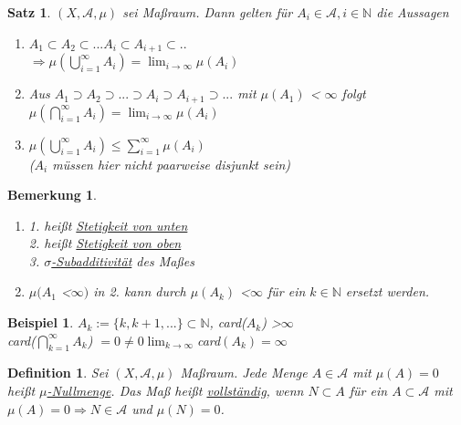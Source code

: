 \documentclass[11pt]{memoir}
\theoremstyle{changebreak}
\newtheorem{Definition}{Definition}[chapter]
\newtheorem{Bemerkung}{Bemerkung}[chapter]
\newtheorem{Beispiel}{Beispiel}[chapter]
\newtheorem{Satz}{Satz}[chapter]
\begin{document}
\begin{Satz}
$(X, \mathscr{A}, \mu)$ sei Maßraum. Dann gelten für $A_i \in \mathscr{A}, i \in \mathbb{N}$ die Aussagen
\begin{enumerate}
	\item $A_1 \subset A_2 \subset ...  A_i \subset A_{i+1} \subset .. $\\
	$\Rightarrow \mu(\bigcup\limits_{i=1}^{\infty} A_i) = \lim_{i \rightarrow \infty} \mu(A_i)$
	\item Aus $A_1 \supset A_2 \supset ... \supset A_i \supset A_{i+1} \supset ...$ mit $\mu(A_1)$ \textless  {} $ \infty$ folgt\\
	$\mu(\bigcap\limits_{i=1}^{\infty} A_i) = \lim_{i \rightarrow \infty} \mu(A_i)$
	\item $\mu(\bigcup\limits_{i=1}^{\infty} A_i) \leq \sum\limits_{i=1}^{\infty} \mu(A_i)$ \\
	($A_i$ müssen hier nicht paarweise disjunkt sein)
\end{enumerate}
\end{Satz}

\begin{Bemerkung}
\begin{enumerate}
	\item \emph{1.} heißt \underline{Stetigkeit von unten} \\
	\emph{2.} heißt \underline{Stetigkeit von oben} \\
	\emph{3.} \underline{$\sigma$-Subadditivität} des Maßes
	\item  $\mu(A_1$ \textless $\infty)$ in \emph{2.} kann durch $\mu(A_k) $ \textless  $\infty$ für ein $k \in \mathbb{N}$ ersetzt werden.
\end{enumerate}
\end{Bemerkung}

\begin{Beispiel}
$A_k := \{k, k+1, ... \} \subset \mathbb{N}$, card($A_k$) \textgreater $ \infty$ \\
card($\bigcap\limits_{k=1}^{\infty} A_k$) $= 0 \ne 0 \lim_{k \rightarrow \infty} $card$ (A_k) = \infty$
\end{Beispiel}

\begin{Definition}
Sei $(X, \mathscr{A}, \mu)$ Maßraum. Jede Menge $A \in \mathscr{A}$ mit $\mu(A) = 0$ heißt \underline{$\mu$-Nullmenge}. Das Maß heißt \underline{vollständig}, wenn $N \subset A $ für ein $A \subset \mathscr{A}$ mit $\mu(A) = 0 \Rightarrow N \in \mathscr{A}$ und $\mu(N) = 0$.
\end{Definition}
\end{document}
